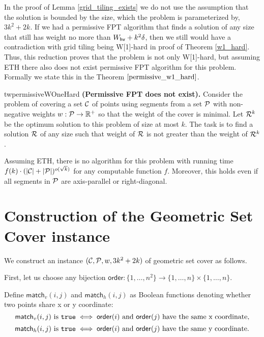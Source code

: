 In the proof of Lemma \ref{grid_tiling_exists}
we do not use the assumption that
the solution is bounded by the size,
which the problem is parameterized by, $3k^2+2k$.
If we had a permissive FPT algorithm
that finds a solution of any size that still
has weight no more than $W_{\mathsf{hv}}+k^2\delta$,
then we still would have a contradiction with grid tiling being W[1]-hard
in proof of Theorem \ref{w1_hard}.
Thus, this reduction
proves that the problem is not only W[1]-hard, but assuming ETH 
there also does not exist permissive FPT algorithm for this problem.
Formally we state this in the Theorem $\ref{permissive_w1_hard}$.


\begin{restatable}{tw}{permissiveWOneHard}
\label{permissive_w1_hard}
\textbf{(Permissive FPT does not exist).}
	Consider the problem of covering a set $\mathcal{C}$ of points
	using segments from a set $\mathcal{P}$ 
	with non-negative weights $w : \mathcal{P} \rightarrow \mathbb{R^+}$
	so that the weight of the cover is minimal.
	Let $\mathcal{R}^k$ be the
	optimum solution to this problem of size at most $k$.
	The task is to find a solution $\mathcal{R}$ of any size
	such that weight of $\mathcal{R}$ is not greater than the weight of $\mathcal{R}^k$.
	
	Assuming ETH, there is no algorithm for this
	problem with running time
	$f(k)\cdot(|\mathcal{C}| + |\mathcal{P}|)^{o(\sqrt{k})}$
	for any computable function $f$.
	Moreover, this holds even if all segments in $\mathcal{P}$
	are axis-parallel or right-diagonal.
\end{restatable}

\section{Construction of the Geometric Set Cover instance}
\newcommand{\order}{\mathsf{order}}
\newcommand{\matchv}{\mathsf{match}_v}
\newcommand{\matchh}{\mathsf{match}_h}

We construct an instance $(\mathcal{C}, \mathcal{P}, w, 3k^2+2k)$ of geometric set cover as follows.

First, let us choose any bijection
$\order : \{1, \ldots, n^2\} \rightarrow \{1, \ldots, n\} \times \{1, \ldots, n\}$.


Define $\matchv(i, j)$ and $\matchh(i, j)$
as Boolean functions denoting whether two points share x or y coordinate:
$$\matchv(i, j) \text{ is } \true \iff
\order(i) \text{ and } \order(j) \text{ have the same x coordinate,}$$
$$\matchh(i, j) \text{ is } \true \iff
\order(i) \text{ and } \order(j) \text{ have the same y coordinate.}$$


